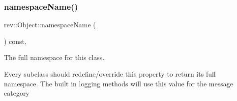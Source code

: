 \subsubsection{\texorpdfstring{namespaceName()}{namespaceName()}}
{\footnotesize\ttfamily rev\+::\+Object\+::namespace\+Name (\begin{DoxyParamCaption}{ }\end{DoxyParamCaption}) const\hspace{0.3cm}{\ttfamily [inline]}, {\ttfamily [virtual]}}



The full namespace for this class. 

Every subclass should redefine/override this property to return its full namespace. The built in logging methods will use this value for the message category 

